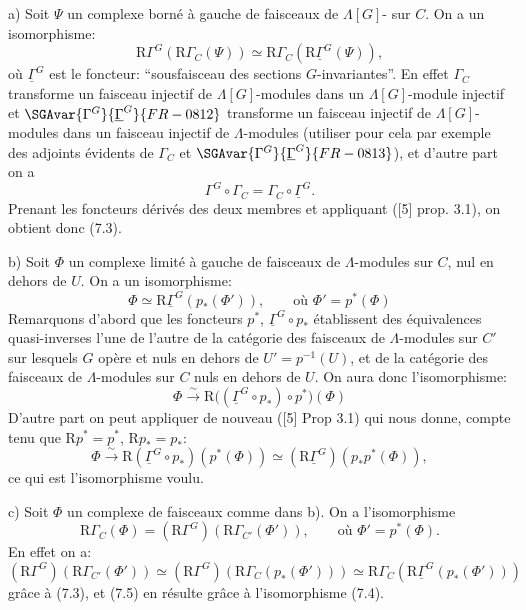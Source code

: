 a) Soit $\Psi$ un complexe borné à gauche de faisceaux de $\Lambda[G]$- sur $C$. On a un isomorphisme:
\[
\mathrm{R}\Gamma^G(\mathrm{R}\Gamma_C(\Psi))\simeq\mathrm{R}\Gamma_C(\mathrm{R}\underline{\Gamma}^G(\Psi)),
\tag{7.3}
\]
où $\underline{\Gamma}^G$ est le foncteur: ``sousfaisceau des sections $G$-invariantes''. En effet $\Gamma_C$ transforme un faisceau injectif de $\Lambda[G]$-modules dans un $\Lambda[G]$-module injectif et $\SGAvar{\Gamma^G}{\underline{\Gamma}^G}{FR-0812}$ transforme un faisceau injectif de $\Lambda[G]$-modules dans un faisceau injectif de $\Lambda$-modules (utiliser pour cela par exemple des adjoints évidents de $\Gamma_C$ et $\SGAvar{\Gamma^G}{\underline{\Gamma}^G}{FR-0813}$), et d'autre part on a
\[
\Gamma^G\circ\Gamma_C=\Gamma_C\circ\underline{\Gamma}^G.
\]
Prenant les foncteurs dérivés des deux membres et appliquant ([5] prop. 3.1), on obtient donc (7.3).

b) Soit $\Phi$ un complexe limité à gauche de faisceaux de $\Lambda$-modules sur $C$, nul en dehors de $U$. On a un isomorphisme:
\[
\Phi\simeq \mathrm{R}\underline{\Gamma}^G(p_*(\Phi')),
\qquad\text{où } \Phi'=p^*(\Phi)
\tag{7.4}
\]
Remarquons d'abord que les foncteurs $p^*$, $\underline{\Gamma}^G\circ p_*$ établissent des équivalences quasi-inverses l'une de l'autre de la catégorie des faisceaux de $\Lambda$-modules sur $C'$ sur lesquels $G$ opère et nuls en dehors de $U'=p^{-1}(U)$, et de la catégorie des faisceaux de $\Lambda$-modules sur $C$ nuls en dehors de $U$. On aura donc l'isomorphisme:
\[
\Phi\xrightarrow{\sim} \mathrm{R}\bigl((\underline{\Gamma}^G\circ p_*)\circ p^*\bigr)(\Phi)
\]
D'autre part on peut appliquer de nouveau ([5] Prop 3.1) qui nous donne, compte tenu que $\mathrm{R} p^*=p^*$, $\mathrm{R} p_*=p_*$:
\[
\Phi\xrightarrow{\sim} \mathrm{R}(\underline{\Gamma}^G\circ p_*)(p^*(\Phi))
\simeq (\mathrm{R}\underline{\Gamma}^G)(p_*p^*(\Phi)),
\]
ce qui est l'isomorphisme voulu.

c) Soit $\Phi$ un complexe de faisceaux comme dans b). On a l'isomorphisme
\[
\mathrm{R}\Gamma_C(\Phi)=(\mathrm{R}\Gamma^G)(\mathrm{R}\Gamma_{C'}(\Phi')),
\qquad\text{où } \Phi'=p^*(\Phi).
\tag{7.5}
\]
En effet on a:
\[
(\mathrm{R}\Gamma^G)(\mathrm{R}\Gamma_{C'}(\Phi'))
\simeq
(\mathrm{R}\Gamma^G)(\mathrm{R}\Gamma_C(p_*(\Phi')))
\simeq
\mathrm{R}\Gamma_C(\mathrm{R}\underline{\Gamma}^G(p_*(\Phi')))
\]
grâce à (7.3), et (7.5) en résulte grâce à l'isomorphisme (7.4).

